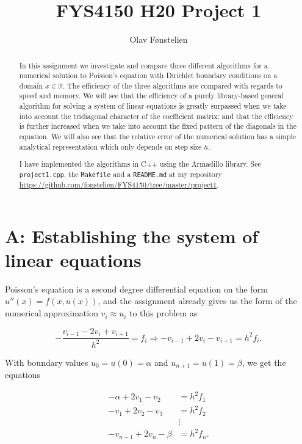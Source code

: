 \documentclass[]{article}
\title{FYS4150 H20 Project 1}
\author{Olav Fønstelien}
\begin{document}
\maketitle

\begin{abstract}
In this assignment we investigate and compare three different algorithms for a numerical solution to Poisson's equation with Dirichlet boundary conditions on a domain $x \in \mathbb{R}$. The efficiency of the three algorithms are compared with regards to speed and memory. We will see that the efficiency of a purely library-based general algorithm for solving a system of linear equations is greatly surpassed when we take into account the tridiagonal character of the coefficient matrix; and that the efficiency is further increased when we take into account the fixed pattern of the diagonals in the equation. We will also see that the relative error of the numerical solution has a simple analytical representation which only depends on step size $h$. 

I have implemented the algorithms in C++ using the Armadillo library. See \lstinline|project1.cpp|, the \lstinline|Makefile| and a \lstinline|README.md| at my repository \url{https://github.com/fonstelien/FYS4150/tree/master/project1}.
\end{abstract}

\section*{A: Establishing the system of linear equations}
Poisson's equation is a second degree differential equation on the form $u''(x) = f(x, u(x))$, and the assignment already gives us the form of the numerical approximation $v_i \approx u_i$ to this problem as

\begin{equation}
\label{eqn:approx_2nd_der}
-\frac{v_{i-1} -2v_i + v_{i+1}}{h^2} = f_i \Rightarrow -v_{i-1} +2v_i - v_{i+1} = h^{2}f_i.
\end{equation}

With boundary values $u_0 = u(0) = \alpha$ and $u_{n+1} = u(1) = \beta$, we get the equations

\begin{align*}
-\alpha + 2v_1 - v_2 &= h^{2}f_1 \\
-v_1 + 2v_2 - v_3 &= h^{2}f_2 \\
&\vdots \\
-v_{n-1} + 2v_n -\beta &= h^{2}f_n.
\end{align*}
\end{document}
